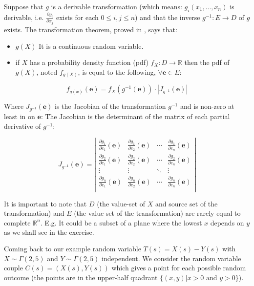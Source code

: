 \documentclass{article}
\newcommand\R{{\mathbb R} }
\begin{document}
Suppose that $g$ is a derivable transformation (which means: $g_i(x_1,...,x_n)$ is derivable, i.e. $\frac{\partial g_i}{\partial x_j}$ exists for each $0 \le i,j  \le n$)  and that the inverse $g^{-1}:E\longrightarrow D$ of $g$ exists. The transformation theorem, proved in \cite[2.7]{Hogg-McKean}, says that:

\begin{itemize}
\item $g(X)$ It is a continuous random variable.
\item if $X$ has a probability density function (pdf) $f_X:D \rightarrow \R $ then the pdf of
  $g(X)$, noted $f_{g(X)}$, is equal to the following, $\forall {\mathbf e} \in E$:
\end{itemize}

$$  f_{g(x)}({\mathbf e}) = f_X(g^{-1}({\mathbf e})) \cdot | J_{g^{-1}}({\mathbf e})|$$

Where $J_{g^{-1}}({\mathbf e})$ is the Jacobian of the transformation $g^{-1}$ and is non-zero at least in on ${\mathbf e}$: The Jacobian is the determinant of the matrix of each partial derivative of $g^{-1}$:

\renewcommand\arraystretch{2}
$$        J_{g^{-1}}({\mathbf e}) = \left|\begin{array}{lllll}
            \frac{\partial g_1}{\partial e_1}({\mathbf e}) & \frac{\partial g_1}{\partial e_2}({\mathbf e}) & \cdots & \frac{\partial g_1}{\partial e_n}({\mathbf e})\\
            \frac{\partial g_2}{\partial e_1}({\mathbf e}) & \frac{\partial g_2}{\partial e_2}({\mathbf e}) & \cdots & \frac{\partial g_2}{\partial e_n}({\mathbf e})\\
            \vdots & \vdots & \ddots & \vdots \\
            \frac{\partial g_n}{\partial e_1}({\mathbf e}) & \frac{\partial g_n}{\partial e_2}({\mathbf e}) & \cdots & \frac{\partial g_n}{\partial e_n}({\mathbf e})\\
        \end{array}\right| $$

\renewcommand\arraystretch{1}

It is important to note that $D$ (the value-set of $X$ and source set of the transformation) and $E$ (the value-set of the transformation) are rarely equal to complete $\R^n$. E.g. It could be a subset of a plane where the lowest $x$ depends on $y$ as we shall see in the exercise.



Coming back to our example random variable $T(s)=X(s)-Y(s)$ with $X\sim \Gamma(2,5)$ and $Y\sim \Gamma(2,5)$ independent. We consider the random variable  couple $C(s) = (X(s), Y(s))$ which gives a point for each possible random outcome (the points are in the upper-half quadrant $\{(x,y)| x>0 \mbox{ and } y>0\}$). 
\end{document}

